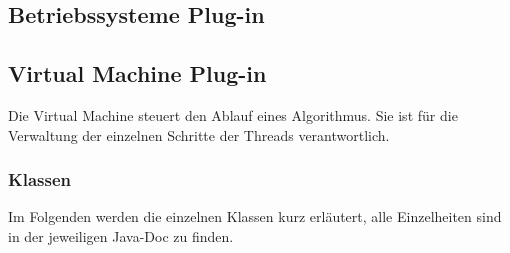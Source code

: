 \documentclass[10pt,a4paper,oneside]{scrbook}
\begin{document}
\subsection{Betriebssysteme Plug-in}







\subsection{Virtual Machine Plug-in}
Die Virtual Machine steuert den Ablauf eines Algorithmus. Sie ist für die Verwaltung der einzelnen
Schritte der Threads verantwortlich.

\subsubsection{Klassen}
Im Folgenden werden die einzelnen Klassen kurz erläutert, alle Einzelheiten sind in der jeweiligen Java-Doc zu finden.
\end{document}
